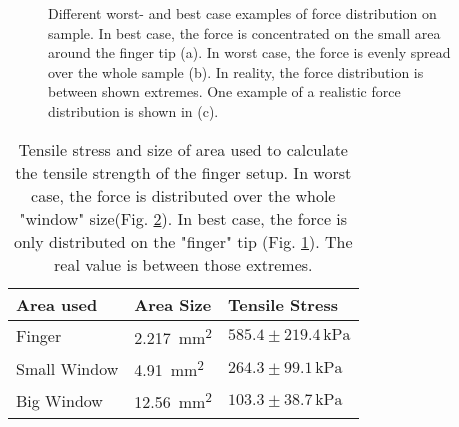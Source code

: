 \begin{figure}[hbt!]
	\centering
	\begin{subfigure}[]{0.3\textwidth}
		\centering
		
		\caption{}
		\label{fig:ZeichnungBerechnungStress_a}
	\end{subfigure}
	\begin{subfigure}[]{0.3\textwidth}
		\centering
		
		\caption{}
		\label{fig:ZeichnungBerechnungStress_b}
	\end{subfigure}
	\begin{subfigure}[]{0.3\textwidth}
		\centering
		
		\caption{}
		\label{fig:ZeichnungBerechnungStress_c}
	\end{subfigure}
	\caption{Different worst- and best case examples of force distribution on sample. In best case, the force is concentrated on the small area around the finger tip (a). In worst case, the force is evenly spread over the whole sample (b). In reality, the force distribution is between shown extremes. One example of a realistic force distribution is shown in (c).}
	\label{fig:ZeichnungBerechnungStress}
\end{figure}


\begin{table}[hbt!]
	\centering
	\begin{tabular}{|l|l|l|}
		\hline
		Area used & Area Size & Tensile Stress\\
		\hline
		\hline
		Finger & \SI{2.217}{\milli\meter\squared} & $585.4\pm219.4\,\si{\kilo\pascal}$ \\ 
		\hline
		Small Window & \SI{4.91}{\milli\meter\squared} & $264.3\pm99.1\,\si{\kilo\pascal}$ \\ 
		\hline
		Big Window & \SI{12.56}{\milli\meter\squared} & $103.3\pm38.7\,\si{\kilo\pascal}$ \\ 
		\hline
	\end{tabular}
	\caption{Tensile stress and size of area used to calculate the tensile strength of the finger setup. In worst case, the force is distributed over the whole "window" size(Fig. \ref{fig:ZeichnungBerechnungStress_b}). In best case, the force is only distributed on the "finger" tip (Fig. \ref{fig:ZeichnungBerechnungStress_a}). The real value is between those extremes.}
	\label{table:VerschAbschätzungenStressFinger}
\end{table}

\FloatBarrier

